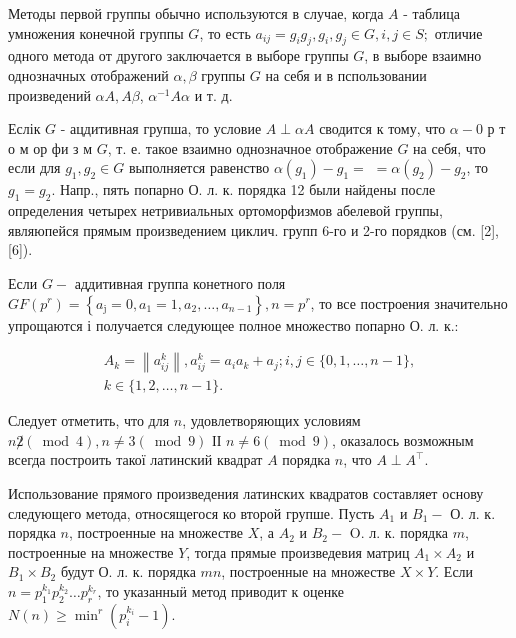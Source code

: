 \documentclass[10pt]{article}
\begin{document}
Методы первой группы обычно используются в случае, когда $A$ - таблица умножения конечной группы $G$, то есть $a_{i j}=g_{i} g_{j}, g_{i}, g_{j} \in G, i, j \in S ;$ отличие одного метода от другого заключается в выборе группы $G$, в выборе взаимно однозначных отображений $\alpha, \beta$ группы $G$ на себя и в пспользовании произведений $\alpha A, A \beta$, $\alpha^{-1} A \alpha$ и т. д.

Еслік $G$ - ацдитивная групша, то условие $A \perp \alpha A$ сводится к тому, что $\alpha-0$ р т о м ор фи з м $G$, т. е. такое взаимно однозначное отображение $G$ на себя, что если для $g_{1}, g_{2} \in G$ выполняется равенство $\alpha\left(g_{1}\right)-g_{1}=$ $=\alpha\left(g_{2}\right)-g_{2}$, то $g_{1}=g_{2}$. Напр., пять попарно О. л. к. порядка 12 были найдены после определения четырех нетривиальных ортоморфизмов абелевой группы, являюпейся прямым произведением циклич. групп 6-го и 2-го порядков (см. [2], [6]).

Если $G-$ аддитивная группа конетного поля $G F\left(p^{r}\right)=\left\{a_{\mathrm{j}}=0, a_{1}=1, a_{2}, \ldots, a_{n-1}\right\}, n=p^{r}$, то все построения значительно упрощаются і получается следующее полное множество попарно О. л. к.:

\[
\begin{gathered}
A_{k}=\left\|a_{i j}^{k}\right\|, a_{i j}^{k}=a_{i} a_{k}+a_{j} ; i, j \in\{0,1, \ldots, n-1\}, \\
k \in\{1,2, \ldots, n-1\} .
\end{gathered}
\]

Следует отметить, что для $n$, удовлетворяющих условиям $n \not 2(\bmod 4), n \neq 3(\bmod 9)$ ІІ $n \neq 6(\bmod 9)$, оказалось возможным всегда построить такої латинский квадрат $A$ порядка $n$, что $A \perp A^{\top}$.

Использование прямого произведения латинских квадратов составляет основу следующего метода, относящегося ко второй групше. Пусть $A_{1}$ и $B_{1}-$ О. л. к. порядка $n$, построенные на множестве $X$, а $A_{2}$ и $B_{2}-$ O. л. к. порядка $m$, построенные на множестве $Y$, тогда прямые произведевия матриц $A_{1} \times A_{2}$ и $B_{1} \times B_{2}$ будут О. л. к. порядка $m n$, построенные на множестве $X \times Y$. Если $n=p_{1}^{k_{1}} p_{2}^{k_{2}} \ldots p_{r}^{k_{r}}$, то указанныӥ метод приводит к оценке $N(n) \geqslant \min ^{r}\left(p_{i}^{k_{i}}-1\right)$.
\end{document}
